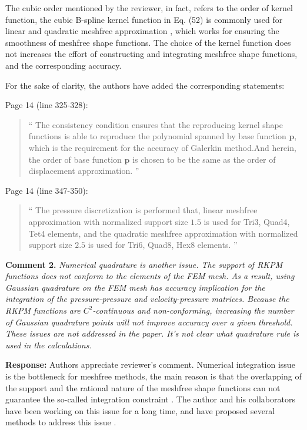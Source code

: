 \documentclass{article}
\begin{document}
The cubic order mentioned by the reviewer, in fact, refers to the order of kernel function, the cubic B-spline kernel function in Eq. (52) is commonly used for linear and quadratic meshfree approximation \cite{}, which works for ensuring the smoothness of meshfree shape functions. 
The choice of the kernel function does not increases the effort of constructing and integrating meshfree shape functions, and the corresponding accuracy.

For the sake of clarity, the authors have added the corresponding statements:

Page 14 (line 325-328):
\begin{quote}``
The consistency condition ensures that the reproducing kernel shape functions is able to reproduce the polynomial spanned by base function $\boldsymbol{p}$, which is the requirement for the accuracy of Galerkin method.And herein, the order of base function $\boldsymbol p$ is chosen to be the same as the order of displacement approximation.
''\end{quote}

Page 14 (line 347-350):
\begin{quote}``
The pressure discretization is performed that, linear meshfree approximation with normalized support size $1.5$ is used for Tri3, Quad4, Tet4 elements, and the quadratic meshfree approximation with normalized support size $2.5$ is used for Tri6, Quad8, Hex8 elements.
''\end{quote}

\textbf{Comment 2.} \textit{Numerical quadrature is another issue. The support of RKPM functions does not conform to the elements of the FEM mesh. As a result, using Gaussian quadrature on the FEM mesh has accuracy implication for the integration of the pressure-pressure and velocity-pressure matrices. Because the RKPM functions are $C^2$-continuous and non-conforming, increasing the number of Gaussian quadrature points will not improve accuracy over a given threshold. These issues are not addressed in the paper. It's not clear what quadrature rule is used in the calculations.}

\textbf{Response:} Authors appreciate reviewer's comment.
Numerical integration issue is the bottleneck for meshfree methods, the main reason is that the overlapping of the support and the rational nature of the meshfree shape functions can not guarantee the so-called integration constraint \cite{}.
The author and his collaborators have been working on this issue for a long time, and have proposed several methods to address this issue \cite{wu2022, wu2023, wu2023a}.
\end{document}
